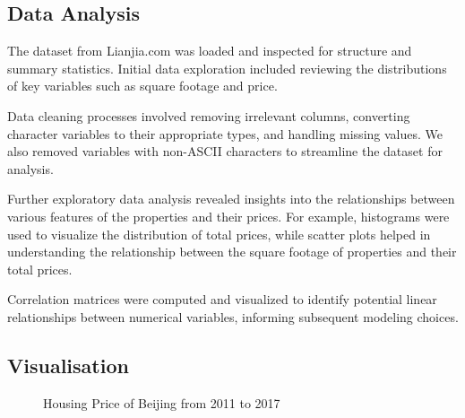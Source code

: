 \documentclass[
  letterpaper,
  DIV=11,
  numbers=noendperiod]{scrartcl}
\begin{document}
\subsection{Data Analysis}\label{data-analysis}

The dataset from Lianjia.com was loaded and inspected for structure and
summary statistics. Initial data exploration included reviewing the
distributions of key variables such as square footage and price.

Data cleaning processes involved removing irrelevant columns, converting
character variables to their appropriate types, and handling missing
values. We also removed variables with non-ASCII characters to
streamline the dataset for analysis.

Further exploratory data analysis revealed insights into the
relationships between various features of the properties and their
prices. For example, histograms were used to visualize the distribution
of total prices, while scatter plots helped in understanding the
relationship between the square footage of properties and their total
prices.

Correlation matrices were computed and visualized to identify potential
linear relationships between numerical variables, informing subsequent
modeling choices.

\subsection{Visualisation}\label{visualisation}

\begin{figure}


\caption{\label{fig-totalprice-distribution}Housing Price of Beijing
from 2011 to 2017}

\end{figure}%
\end{document}
